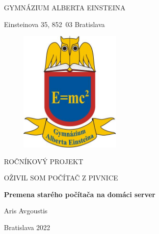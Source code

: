 \begin{titlepage}
    \centering
    \onehalfspacing

    {\fontsize{16}{16}\selectfont GYMNÁZIUM ALBERTA EINSTEINA}  %

    \vspace{0.5cm}

    {\fontsize{16}{16}\selectfont Einsteinova 35, \mbox{852 03} Bratislava}  %

    \vspace{2cm}

    \begin{figure}[htpb]  %
        \centering
        \includegraphics[height=6cm]{einsteinova-logo.png}
        \label{fig:einsteinova-logo.png}
    \end{figure}

    \vspace{0.5cm}

    {\fontsize{20}{20}\selectfont ROČNÍKOVÝ PROJEKT}

    \vspace{2.5cm}

    {\Large{OŽIVIL SOM POČÍTAČ Z PIVNICE}}  %

    \vspace{0.5cm}

    {\fontsize{16}{16}\bfseries Premena starého počítača na domáci server}  %
    
    \vspace{3.5cm}

    {\fontsize{16}{16}\selectfont Aris Avgoustis}

    \vspace{2cm}

    {\fontsize{16}{16}\selectfont Bratislava 2022}

\end{titlepage}

    \newpage

